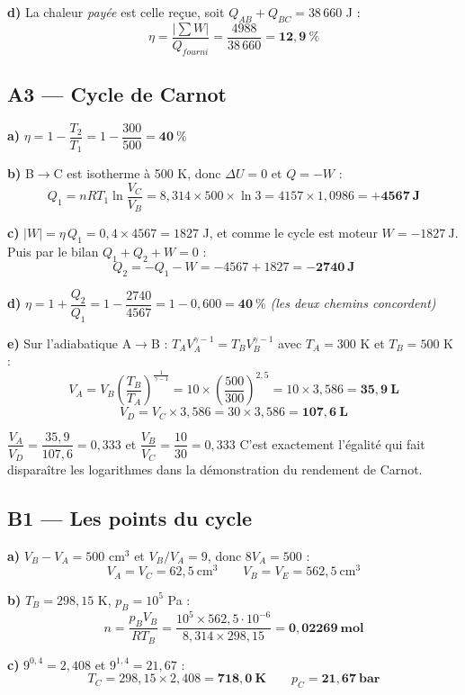 \documentclass[11pt,a4paper]{article}
\newcommand{\eqb}[1]{\[\boxed{#1}\]}
\begin{document}
\textbf{d)} La chaleur \emph{payée} est celle reçue, soit $Q_{AB}+Q_{BC}=38\,660$ J :
\eqb{\eta=\frac{|\sum W|}{Q_{fourni}}=\frac{4988}{38\,660}=\mathbf{12{,}9\ \%}}

\subsection{A3 --- Cycle de Carnot}

\textbf{a)} $\eta=1-\dfrac{T_2}{T_1}=1-\dfrac{300}{500}=\mathbf{40\ \%}$

\textbf{b)} B$\to$C est isotherme à 500 K, donc $\Delta U=0$ et $Q=-W$ :
\[Q_1=nRT_1\ln\frac{V_C}{V_B}=8{,}314\times500\times\ln 3=4157\times1{,}0986=\mathbf{+4567\ \text{J}}\]

\textbf{c)} $|W|=\eta\,Q_1=0{,}4\times4567=1827$ J, et comme le cycle est moteur
$\boxed{W=-1827\ \text{J}}$. Puis par le bilan $Q_1+Q_2+W=0$ :
\[Q_2=-Q_1-W=-4567+1827=\mathbf{-2740\ \text{J}}\]

\textbf{d)} $\eta=1+\dfrac{Q_2}{Q_1}=1-\dfrac{2740}{4567}=1-0{,}600=\mathbf{40\ \%}$ \checkmark
\emph{(les deux chemins concordent)}

\textbf{e)} Sur l'adiabatique A$\to$B : $T_AV_A^{\gamma-1}=T_BV_B^{\gamma-1}$ avec $T_A=300$ K
et $T_B=500$ K :
\[V_A=V_B\left(\frac{T_B}{T_A}\right)^{\frac{1}{\gamma-1}}
=10\times\left(\frac{500}{300}\right)^{2,5}=10\times3{,}586=\mathbf{35{,}9\ \text{L}}\]
\[V_D=V_C\times3{,}586=30\times3{,}586=\mathbf{107{,}6\ \text{L}}\]
\begin{verif}
$\dfrac{V_A}{V_D}=\dfrac{35{,}9}{107{,}6}=0{,}333$ \; et \; $\dfrac{V_B}{V_C}=\dfrac{10}{30}=0{,}333$
\checkmark \; C'est exactement l'égalité qui fait disparaître les logarithmes dans la
démonstration du rendement de Carnot.
\end{verif}

\subsection{B1 --- Les points du cycle}

\textbf{a)} $V_B-V_A=500$ cm$^3$ et $V_B/V_A=9$, donc $8V_A=500$ :
\eqb{V_A=V_C=62{,}5\ \text{cm}^3 \qquad V_B=V_E=562{,}5\ \text{cm}^3}

\textbf{b)} $T_B=298{,}15$ K, $p_B=10^5$ Pa :
\[n=\frac{p_BV_B}{RT_B}=\frac{10^5\times562{,}5\cdot10^{-6}}{8{,}314\times298{,}15}
=\mathbf{0{,}02269\ \text{mol}}\]

\textbf{c)} $9^{0,4}=2{,}408$ et $9^{1,4}=21{,}67$ :
\[T_C=298{,}15\times2{,}408=\mathbf{718{,}0\ \text{K}}\qquad p_C=\mathbf{21{,}67\ \text{bar}}\]
\end{document}
